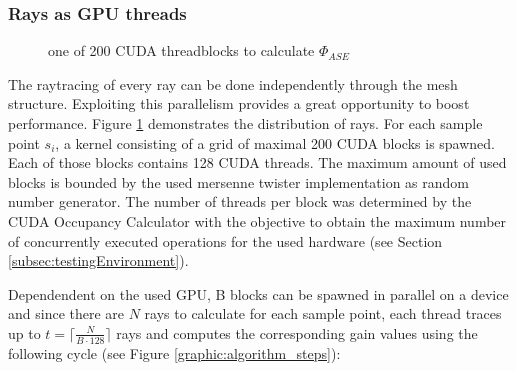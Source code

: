 \subsubsection{Rays as GPU threads}
\label{subsubsec:rays}
\begin{figure}[H]
  \centerline
  {}
  \caption{one of 200 CUDA threadblocks to calculate $\Phi_{ASE}$}
  \label{graphic:kernel}
\end{figure}
    The raytracing of every ray can be done independently through the mesh
    structure.  Exploiting this parallelism provides a great opportunity to
    boost performance. Figure \ref{graphic:kernel} demonstrates the distribution
    of rays. For each sample point $s_i$, a kernel consisting of a grid of 
    maximal 200 CUDA blocks is spawned. Each of those blocks contains 128 CUDA threads.
    The maximum amount of used blocks is bounded by the used
    mersenne twister implementation \cite{mersenne_twister} as random number generator.
    The number of threads per block was determined by the CUDA Occupancy 
    Calculator \cite{occupancy_calculator} with the objective to obtain the
    maximum number of concurrently executed operations for the used hardware
    (see Section \ref{subsec:testingEnvironment}).
    
    Dependendent on the used GPU, B blocks can be spawned
    in parallel on a device and since there are $N$ rays to calculate for each sample point, each thread
    traces up to $t = \lceil\frac {N}{B\cdot128}\rceil$ rays and computes the
    corresponding gain values using the following cycle (see Figure
    \ref{graphic:algorithm_steps}):
    
